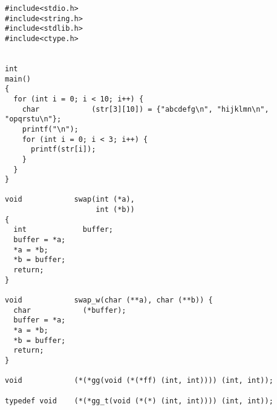  \begin{verbatim}
#include<stdio.h>
#include<string.h>
#include<stdlib.h>
#include<ctype.h>


int 
main()
{
  for (int i = 0; i < 10; i++) {
    char            (str[3][10]) = {"abcdefg\n", "hijklmn\n", "opqrstu\n"};
    printf("\n");
    for (int i = 0; i < 3; i++) {
      printf(str[i]);
    }
  }
}

void            swap(int (*a), 
                     int (*b))
{
  int             buffer;
  buffer = *a;
  *a = *b;
  *b = buffer;
  return;
}

void            swap_w(char (**a), char (**b)) {
  char            (*buffer);
  buffer = *a;
  *a = *b;
  *b = buffer;
  return;
}

void            (*(*gg(void (*(*ff) (int, int)))) (int, int));

typedef void    (*(*gg_t(void (*(*) (int, int)))) (int, int));
\end{verbatim} 
